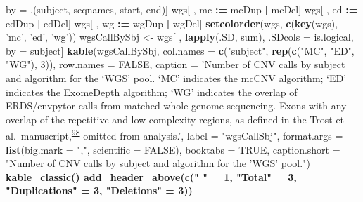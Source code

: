 \documentclass[11pt,letterpaper]{book}
\newenvironment{Shaded}{\begin{snugshade}}{\end{snugshade}}
\newcommand{\DataTypeTok}[1]{\textcolor[rgb]{0.13,0.29,0.53}{#1}}
\newcommand{\DecValTok}[1]{\textcolor[rgb]{0.00,0.00,0.81}{#1}}
\newcommand{\ErrorTok}[1]{\textcolor[rgb]{0.64,0.00,0.00}{\textbf{#1}}}
\newcommand{\KeywordTok}[1]{\textcolor[rgb]{0.13,0.29,0.53}{\textbf{#1}}}
\newcommand{\NormalTok}[1]{#1}
\newcommand{\OperatorTok}[1]{\textcolor[rgb]{0.81,0.36,0.00}{\textbf{#1}}}
\newcommand{\OtherTok}[1]{\textcolor[rgb]{0.56,0.35,0.01}{#1}}
\newcommand{\StringTok}[1]{\textcolor[rgb]{0.31,0.60,0.02}{#1}}
\begin{document}
\begin{Shaded}
\begin{Highlighting}[]
{{{{{{{{{{{\NormalTok{           by =}\StringTok{ }\NormalTok{.(subject, seqnames, start, end)]}
\NormalTok{wgs[ , mc }\OperatorTok{:}\ErrorTok{=}\StringTok{ }\NormalTok{mcDup }\OperatorTok{|}\StringTok{ }\NormalTok{mcDel]}
\NormalTok{wgs[ , ed }\OperatorTok{:}\ErrorTok{=}\StringTok{ }\NormalTok{edDup }\OperatorTok{|}\StringTok{ }\NormalTok{edDel]}
\NormalTok{wgs[ , wg }\OperatorTok{:}\ErrorTok{=}\StringTok{ }\NormalTok{wgDup }\OperatorTok{|}\StringTok{ }\NormalTok{wgDel]}
\KeywordTok{setcolorder}\NormalTok{(wgs, }\KeywordTok{c}\NormalTok{(}\KeywordTok{key}\NormalTok{(wgs), }\StringTok{'mc'}\NormalTok{, }\StringTok{'ed'}\NormalTok{, }\StringTok{'wg'}\NormalTok{))}
\NormalTok{wgsCallBySbj <-}\StringTok{ }\NormalTok{wgs[ , }\KeywordTok{lapply}\NormalTok{(.SD, sum), .SDcols =}\StringTok{ }\NormalTok{is.logical, by =}\StringTok{ }\NormalTok{subject]}
\KeywordTok{kable}\NormalTok{(wgsCallBySbj,}
      \DataTypeTok{col.names =} \KeywordTok{c}\NormalTok{(}\StringTok{"subject"}\NormalTok{, }\KeywordTok{rep}\NormalTok{(}\KeywordTok{c}\NormalTok{(}\StringTok{"MC"}\NormalTok{, }\StringTok{"ED"}\NormalTok{, }\StringTok{"WG"}\NormalTok{), }\DecValTok{3}\NormalTok{)),}
      \DataTypeTok{row.names =} \OtherTok{FALSE}\NormalTok{, }
      \DataTypeTok{caption =} \StringTok{'Number of CNV calls by subject and algorithm for the `WGS' pool. `MC' indicates the mcCNV algorithm; `ED' indicates the ExomeDepth algorithm; `WG' indicates the overlap of ERDS/cnvpytor calls from matched whole-genome sequencing. Exons with any overlap of the repetitive and low-complexity regions, as defined in the Trost et al.~manuscript,\textsuperscript{\protect\hyperlink{ref-trost:2018aa}{98}} omitted from analysis.'}\NormalTok{,}
      \DataTypeTok{label =} \StringTok{"wgsCallSbj"}\NormalTok{,}
      \DataTypeTok{format.args =} \KeywordTok{list}\NormalTok{(}\DataTypeTok{big.mark =} \StringTok{","}\NormalTok{, }\DataTypeTok{scientific =} \OtherTok{FALSE}\NormalTok{),}
      \DataTypeTok{booktabs =} \OtherTok{TRUE}\NormalTok{,}
      \DataTypeTok{caption.short =} \StringTok{"Number of CNV calls by subject and algorithm for the 'WGS' pool."}\NormalTok{) }\OperatorTok{%>%}
\StringTok{  }\KeywordTok{kable_classic}\NormalTok{() }\OperatorTok{%>%}
\StringTok{  }\KeywordTok{add_header_above}\NormalTok{(}\KeywordTok{c}\NormalTok{(}\StringTok{" "}\NormalTok{ =}\StringTok{ }\DecValTok{1}\NormalTok{, }\StringTok{"Total"}\NormalTok{ =}\StringTok{ }\DecValTok{3}\NormalTok{, }\StringTok{"Duplications"}\NormalTok{ =}\StringTok{ }\DecValTok{3}\NormalTok{, }\StringTok{"Deletions"}\NormalTok{ =}\StringTok{ }\DecValTok{3}\NormalTok{))}
}}}}}}}}}}}}}
\end{Highlighting}
\end{Shaded}
\end{document}
